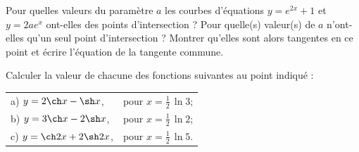 \documentclass[12pt,french,oneside,a4paper]{memoir} %
\begin{document}
\begin{exo}
Pour quelles valeurs du paramètre $a$ les courbes
  d'équations $y=e^{2x}+1$ et $y=2ae^x$ ont-elles des points
  d'intersection ? Pour quelle(s) valeur(s) de $a$ n'ont-elles qu'un
  seul point d'intersection ? Montrer qu'elles sont alors tangentes
  en ce point et écrire l'équation de la tangente commune.
\end{exo}
\begin{exo}
Calculer la valeur de chacune des fonctions suivantes au point
  indiqué :
  
  \begin{tabular}{ll}
  
  a) $y=2\ch x-\sh x$,\qquad &pour \quad
  $\displaystyle{x=\frac{1}{2}\,\ln 3}$;\\[3mm]
  b) $y=3\ch x-2\sh x$,\qquad &pour \quad
  $\displaystyle{x=\frac{1}{2}\,\ln 2}$;\\[3mm]
  c) $y=\ch 2x+2\sh 2x$,\qquad &pour \quad
  $\displaystyle{x=\frac{1}{2}\,\ln 5}$.
  \end{tabular}
\end{exo}
\end{document}
